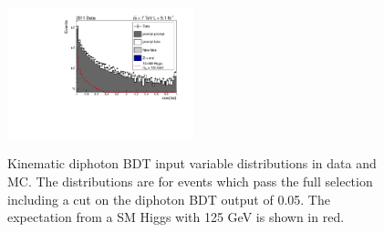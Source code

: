 \begin{figure}[hbt!]
\begin{center}
  \includegraphics[width=0.48\textwidth]{hgg7TeV/variablePlots/cosdphi}
 \label{fig:diphotonbdtvars1}
 \caption{Kinematic diphoton BDT input variable distributions in data and MC. 
	  The distributions are for events which pass the full selection 
	  including a cut on the diphoton BDT output of 0.05.
 	  The expectation from a SM Higgs with 125 GeV is shown in red.}
\end{center}
\end{figure}

